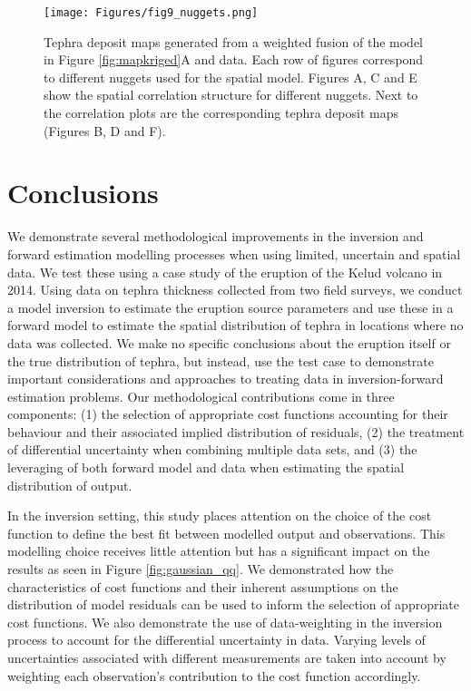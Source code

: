 \documentclass[a4paper,fleqn]{cas-sc}
\begin{document}
    \begin{figure}[htbp!]
    \centering
    \texttt{[image: Figures/fig9\_nuggets.png]}
    \caption{Tephra deposit maps generated from a weighted fusion of the model in Figure \ref{fig:mapkriged}A and data. Each row of figures correspond to different nuggets used for the spatial model. Figures A, C and E show the spatial correlation structure for different nuggets. Next to the correlation plots are the corresponding tephra deposit maps (Figures B, D and F).}
    \label{fig:mapnuggets}
    \end{figure}


\section{Conclusions}\label{section-conclusion}

We demonstrate several methodological improvements in the inversion and forward estimation modelling processes when using limited, uncertain and spatial data. We test these using a case study of the eruption of the Kelud volcano in 2014. Using data on tephra thickness collected from two field surveys, we conduct a model inversion to estimate the eruption source parameters and use these in a forward model to estimate the spatial distribution of tephra in locations where no data was collected. We make no specific conclusions about the eruption itself or the true distribution of tephra, but instead, use the test case to demonstrate important considerations and approaches to treating data in inversion-forward estimation problems. Our methodological contributions come in three components: (1) the selection of appropriate cost functions accounting for their behaviour and their associated implied distribution of residuals, (2) the treatment of differential uncertainty when combining multiple data sets, and (3) the leveraging of both forward model and data when estimating the spatial distribution of output.

In the inversion setting, this study places attention on the choice of the cost function to define the best fit between modelled output and observations. This modelling choice receives little attention but has a significant impact on the results as seen in Figure \ref{fig:gaussian_qq}. We demonstrated how the characteristics of cost functions and their inherent assumptions on the distribution of model residuals can be used to inform the selection of appropriate cost functions. We also demonstrate the use of data-weighting in the inversion process to account for the differential uncertainty in data. Varying levels of uncertainties associated with different measurements are taken into account by weighting each observation's contribution to the cost function accordingly.
\end{document}
